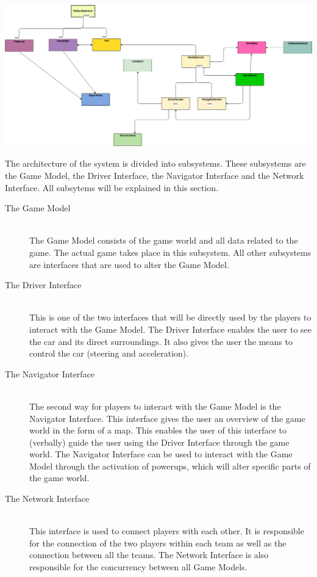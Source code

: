 
\begin{center}
	 \includegraphics[width=180mm]{./images/UML4.png}

\end{center}


The architecture of the system is divided into subsystems. These subsystems are the Game Model, the Driver Interface, the Navigator Interface and the Network Interface. All subsytems will be explained in this section.

\begin{description}
	
\item[The Game Model] \hfill \\
The Game Model consists of the game world and all data related to the game. The actual game takes place in this subsystem. All other subsystems are interfaces that are used to alter the Game Model.

\item[The Driver Interface]  \hfill \\
This is one of the two interfaces that will be directly used by the players to interact with the Game Model. The Driver Interface enables the user to see the car and its direct surroundings. It also gives the user the means to control the car (steering and acceleration). 

\item[The Navigator Interface]  \hfill \\
The second way for players to interact with the Game Model is the Navigator Interface. This interface gives the user an overview of the game world in the form of a map. This enables the user of this interface to (verbally) guide the user using the Driver Interface through the game world. The Navigator Interface can be used to interact with the Game Model through the activation of powerups, which will alter specific parts of the game world.

\item[The Network Interface]  \hfill \\
This interface is used to connect players with each other. It is responsible for the connection of the two players within each team as well as the connection between all the teams. The Network Interface is also responsible for the concurrency between all Game Models.

\end{description}
